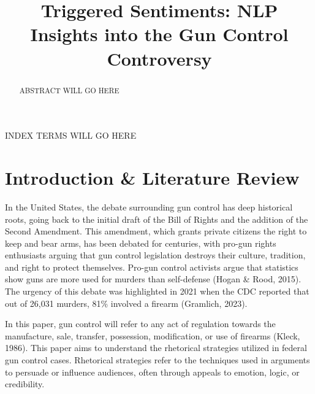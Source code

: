 \documentclass[conference]{IEEEtran}
\begin{document}
\title{Triggered Sentiments: NLP Insights into the Gun Control Controversy}

\author{
}

\maketitle

\begin{abstract}
ABSTRACT WILL GO HERE
\end{abstract}

\begin{IEEEkeywords}
INDEX TERMS WILL GO HERE
\end{IEEEkeywords}

\section{Introduction \& Literature Review}
In the United States, the debate surrounding gun control has deep historical roots, going back to the initial draft of the Bill of Rights and the addition of the Second Amendment. This amendment, which grants private citizens the right to keep and bear arms, has been debated for centuries, with pro-gun rights enthusiasts arguing that gun control legislation destroys their culture, tradition, and right to protect themselves. Pro-gun control activists argue that statistics show guns are more used for murders than self-defense (Hogan \& Rood, 2015). The urgency of this debate was highlighted in 2021 when the CDC reported that out of 26,031 murders, 81\% involved a firearm (Gramlich, 2023).

In this paper, gun control will refer to any act of regulation towards the manufacture, sale, transfer, possession, modification, or use of firearms (Kleck, 1986). This paper aims to understand the rhetorical strategies utilized in federal gun control cases. Rhetorical strategies refer to the techniques used in arguments to persuade or influence audiences, often through appeals to emotion, logic, or credibility.
\end{document}
